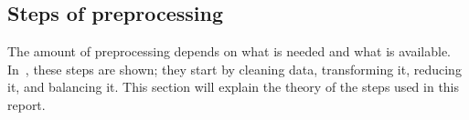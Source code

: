 \subsection{Steps of preprocessing}\label{subsec:preprocessing-steps}
The amount of preprocessing depends on what is needed and what is available. In~\cite{Data-preprocessing-for-flight-delays}, these steps are shown; they start by cleaning data, transforming it, reducing it, and balancing it. This section will explain the theory of the steps used in this report.




%








